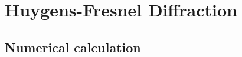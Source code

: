 \documentclass[12pt,twoside,english]{book}
\renewcommand{\~}{\perispomeni}%
\numberwithin{equation}{section}
\numberwithin{figure}{section}
\begin{document}
\chapter{Huygens-Fresnel Diffraction}
\section{Numerical calculation}
\end{document}
